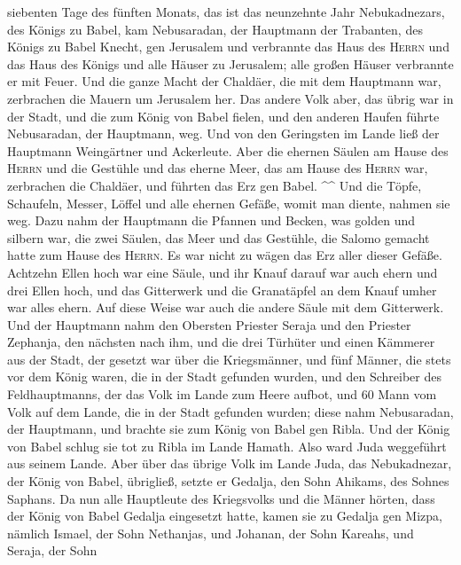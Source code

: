 siebenten Tage des fünften Monats, das ist das neunzehnte Jahr
Nebukadnezars, des Königs zu Babel, kam Nebusaradan, der Hauptmann der
Trabanten, des Königs zu Babel Knecht, gen Jerusalem  und
verbrannte das Haus des \textsc{Herrn} und das Haus des Königs und alle
Häuser zu Jerusalem; alle großen Häuser verbrannte er mit Feuer.
 Und die ganze Macht der Chaldäer, die mit dem Hauptmann
war, zerbrachen die Mauern um Jerusalem her.  Das andere
Volk aber, das übrig war in der Stadt, und die zum König von Babel
fielen, und den anderen Haufen führte Nebusaradan, der Hauptmann, weg.
 Und von den Geringsten im Lande ließ der Hauptmann
Weingärtner und Ackerleute.  Aber die ehernen Säulen am
Hause des \textsc{Herrn} und die Gestühle und das eherne Meer, das am
Hause des \textsc{Herrn} war, zerbrachen die Chaldäer, und führten das
Erz gen Babel. \^{}\^{}  Und die Töpfe, Schaufeln,
Messer, Löffel und alle ehernen Gefäße, womit man diente, nahmen sie
weg.  Dazu nahm der Hauptmann die Pfannen und Becken, was
golden und silbern war,  die zwei Säulen, das Meer und
das Gestühle, die Salomo gemacht hatte zum Hause des \textsc{Herrn}. Es
war nicht zu wägen das Erz aller dieser Gefäße.  Achtzehn
Ellen hoch war eine Säule, und ihr Knauf darauf war auch ehern und drei
Ellen hoch, und das Gitterwerk und die Granatäpfel an dem Knauf umher
war alles ehern. Auf diese Weise war auch die andere Säule mit dem
Gitterwerk.  Und der Hauptmann nahm den Obersten Priester
Seraja und den Priester Zephanja, den nächsten nach ihm, und die drei
Türhüter  und einen Kämmerer aus der Stadt, der gesetzt
war über die Kriegsmänner, und fünf Männer, die stets vor dem König
waren, die in der Stadt gefunden wurden, und den Schreiber des
Feldhauptmanns, der das Volk im Lande zum Heere aufbot, und 60 Mann vom
Volk auf dem Lande, die in der Stadt gefunden wurden; 
diese nahm Nebusaradan, der Hauptmann, und brachte sie zum König von
Babel gen Ribla.  Und der König von Babel schlug sie tot
zu Ribla im Lande Hamath. Also ward Juda weggeführt aus seinem Lande.
 Aber über das übrige Volk im Lande Juda, das
Nebukadnezar, der König von Babel, übrigließ, setzte er Gedalja, den
Sohn Ahikams, des Sohnes Saphans.  Da nun alle Hauptleute
des Kriegsvolks und die Männer hörten, dass der König von Babel Gedalja
eingesetzt hatte, kamen sie zu Gedalja gen Mizpa, nämlich Ismael, der
Sohn Nethanjas, und Johanan, der Sohn Kareahs, und Seraja, der Sohn
